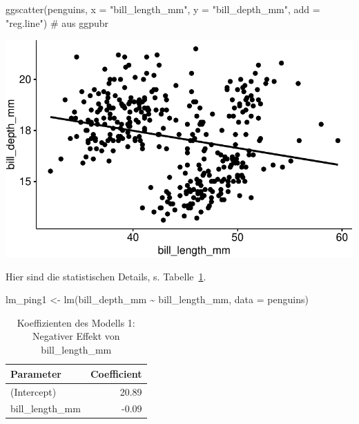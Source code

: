 \documentclass[
  letterpaper,
  oneside,
  open=any]{scrbook}
\newenvironment{Shaded}{\begin{snugshade}}{\end{snugshade}}
\newcommand{\AttributeTok}[1]{\textcolor[rgb]{0.40,0.45,0.13}{#1}}
\newcommand{\CommentTok}[1]{\textcolor[rgb]{0.37,0.37,0.37}{#1}}
\newcommand{\FunctionTok}[1]{\textcolor[rgb]{0.28,0.35,0.67}{#1}}
\newcommand{\NormalTok}[1]{\textcolor[rgb]{0.00,0.23,0.31}{#1}}
\newcommand{\OtherTok}[1]{\textcolor[rgb]{0.00,0.23,0.31}{#1}}
\newcommand{\SpecialCharTok}[1]{\textcolor[rgb]{0.37,0.37,0.37}{#1}}
\newcommand{\StringTok}[1]{\textcolor[rgb]{0.13,0.47,0.30}{#1}}
\theoremstyle{definition}
\theoremstyle{definition}
\theoremstyle{definition}
\theoremstyle{remark}
\begin{document}
\begin{Shaded}
\begin{Highlighting}[]
\FunctionTok{ggscatter}\NormalTok{(penguins, }\AttributeTok{x =} \StringTok{"bill\_length\_mm"}\NormalTok{, }\AttributeTok{y =} \StringTok{"bill\_depth\_mm"}\NormalTok{, }
          \AttributeTok{add =} \StringTok{"reg.line"}\NormalTok{)  }\CommentTok{\# aus \textasciigrave{}ggpubr\textasciigrave{}}
\end{Highlighting}
\end{Shaded}

\begin{center}
\includegraphics[width=1\linewidth,height=\textheight,keepaspectratio]{090-regression2_files/figure-pdf/unnamed-chunk-61-1.pdf}
\end{center}

Hier sind die statistischen Details, s. Tabelle~\ref{tbl-peng-simpson1}.

\begin{Shaded}
\begin{Highlighting}[]
\NormalTok{lm\_ping1 }\OtherTok{\textless{}{-}} \FunctionTok{lm}\NormalTok{(bill\_depth\_mm }\SpecialCharTok{\textasciitilde{}}\NormalTok{ bill\_length\_mm, }\AttributeTok{data =}\NormalTok{ penguins)}
\end{Highlighting}
\end{Shaded}

\begin{longtable}[]{@{}lr@{}}

\caption{\label{tbl-peng-simpson1}Koeffizienten des Modells 1: Negativer
Effekt von bill\_length\_mm}

\tabularnewline

\toprule\noalign{}
Parameter & Coefficient \\
\midrule\noalign{}
\endhead
\bottomrule\noalign{}
\endlastfoot
(Intercept) & 20.89 \\
bill\_length\_mm & -0.09 \\

\end{longtable}
\end{document}
